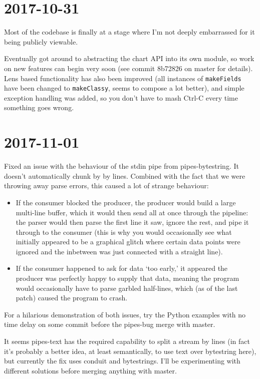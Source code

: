 \documentclass[a5paper,10pt]{article}
\begin{document}
    \section*{2017-10-31}
    
    Most of the codebase is finally at a stage where I'm not deeply embarrassed for it being publicly viewable.
    
    Eventually got around to abstracting the chart API into its own module, so work on new features can begin very soon (see commit 8b72826 on master for details). Lens based functionality has also been improved (all instances of \verb|makeFields| have been changed to \verb|makeClassy|, seems to compose a lot better), and simple exception handling was added, so you don't have to mash Ctrl-C every time something goes wrong.
    
    \section*{2017-11-01}
    
    Fixed an issue with the behaviour of the stdin pipe from pipes-bytestring. It doesn't automatically chunk by by lines. Combined with the fact that we were throwing away parse errors, this caused a lot of strange behaviour:
    \begin{itemize}
        \item If the consumer blocked the producer, the producer would build a large multi-line buffer, which it would then send all at once through the pipeline: the parser would then parse the first line it saw, ignore the rest, and pipe it through to the consumer (this is why you would occasionally see what initially appeared to be a graphical glitch where certain data points were ignored and the inbetween was just connected with a straight line).
        \item If the consumer happened to ask for data `too early,' it appeared the producer was perfectly happy to supply that data, meaning the program would occasionally have to parse garbled half-lines, which (as of the last patch) caused the program to crash.
    \end{itemize}
    For a hilarious demonstration of both issues, try the Python examples with no time delay on some commit before the pipes-bug merge with master.
    
    It seems pipes-text has the required capability to split a stream by lines (in fact it's probably a better idea, at least semantically, to use text over bytestring here), but currently the fix uses conduit and bytestrings. I'll be experimenting with different solutions before merging anything with master.
\end{document}
